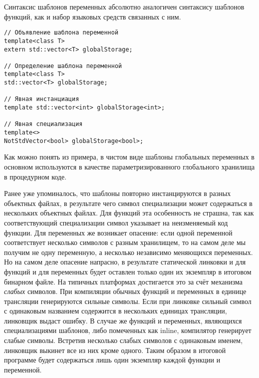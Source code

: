 Синтаксис шаблонов переменных абсолютно аналогичен синтаксису шаблонов функций, как и набор языковых средств связанных с ним.
\begin{verbatim}
// Объявление шаблона переменной
template<class T>
extern std::vector<T> globalStorage;

// Определение шаблона переменной
template<class T>
std::vector<T> globalStorage;

// Явная инстанциация
template std::vector<int> globalStorage<int>;

// Явная специализация
template<>
NotStdVector<bool> globalStorage<bool>;
\end{verbatim}

Как можно понять из примера, в чистом виде шаблоны глобальных переменных в основном используются в качестве параметризированного глобального хранилища в процедурном коде.

Ранее уже упоминалось, что шаблоны повторно инстанцируются в разных объектных файлах, в результате чего символ специализации может содержаться в нескольких объектных файлах. Для функций эта особенность не страшна, так как соответствующий специализации символ указывает на неизменяемый код функции. Для переменных же возникает опасение: если одной переменной соответствует несколько символов с разным хранилищем, то на самом деле мы получим не одну переменную, а несколько независимо меняющихся переменных. Но на самом деле опасение напрасно, в результате статической линковки и для функций и для переменных будет оставлен только один их экземпляр в итоговом бинарном файле. На типичных платформах достигается это за счёт механизма \textit{слабых} символов. При компиляции обычных функций и переменных в единице трансляции генерируются сильные символы. Если при линковке сильный символ с одинаковым названием содержится в нескольких единицах трансляции, линковщик выдаст ошибку. В случае же функций и переменных, являющихся специализациями шаблонов, либо помеченных как inline, компилятор генерирует слабые символы. Встретив несколько слабых символов с одинаковым именем, линковщик выкинет все из них кроме одного. Таким образом в итоговой программе будет содержаться лишь один экземпляр каждой функции и переменной.

